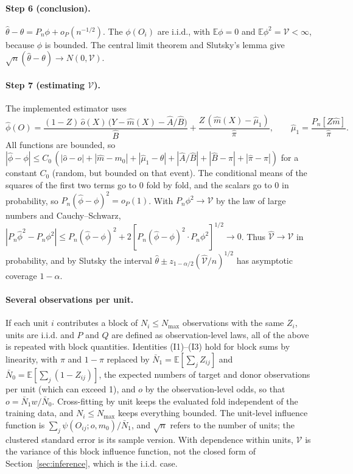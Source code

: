 \documentclass[11pt,a4paper]{article}
\newcommand{\E}{\mathbb{E}}
\theoremstyle{plain}
\theoremstyle{definition}
\begin{document}
\paragraph{Step 6 (conclusion).} $\hat\theta-\theta=P_n\phi+o_P(n^{-1/2})$. The $\phi(O_i)$ are i.i.d., with $\E\phi=0$ and $\E\phi^2=\mathcal V<\infty$, because $\phi$ is bounded. The central limit theorem and Slutsky's lemma give $\sqrt n(\hat\theta-\theta)\to N(0,\mathcal V)$.

\paragraph{Step 7 (estimating $\mathcal V$).} The implemented estimator uses
\[
\hat\phi(O)=\frac{(1-Z)\,\hat o(X)\,\bigl(Y-\hat m(X)-\hat A/\hat B\bigr)}{\hat B}+\frac{Z\,(\hat m(X)-\hat\mu_1)}{\hat\pi},\qquad\hat\mu_1=\frac{P_n[Z\hat m]}{\hat\pi}.
\]
All functions are bounded, so $|\hat\phi-\phi|\le C_0\,(|\hat o-o|+|\hat m-m_0|+|\hat\mu_1-\theta|+|\hat A/\hat B|+|\hat B-\pi|+|\hat\pi-\pi|)$ for a constant $C_0$ (random, but bounded on that event). The conditional means of the squares of the first two terms go to 0 fold by fold, and the scalars go to 0 in probability, so $P_n(\hat\phi-\phi)^2=o_P(1)$. With $P_n\phi^2\to \mathcal V$ by the law of large numbers and Cauchy--Schwarz, $|P_n\hat\phi^2-P_n\phi^2|\le P_n(\hat\phi-\phi)^2+2[P_n(\hat\phi-\phi)^2\cdot P_n\phi^2]^{1/2}\to0$. Thus $\hat{\mathcal V}\to \mathcal V$ in probability, and by Slutsky the interval $\hat\theta\pm z_{1-\alpha/2}(\hat{\mathcal V}/n)^{1/2}$ has asymptotic coverage $1-\alpha$.

\paragraph{Several observations per unit.} If each unit $i$ contributes a block of $N_i\le N_{\max}$ observations with the same $Z_i$, units are i.i.d. and $P$ and $Q$ are defined as observation-level laws, all of the above is repeated with block quantities. Identities (I1)--(I3) hold for block sums by linearity, with $\pi$ and $1-\pi$ replaced by $\bar N_1=\E[\sum_jZ_{ij}]$ and $\bar N_0=\E[\sum_j(1-Z_{ij})]$, the expected numbers of target and donor observations per unit (which can exceed 1), and $o$ by the observation-level odds, so that $o=\bar N_1w/\bar N_0$. Cross-fitting by unit keeps the evaluated fold independent of the training data, and $N_i\le N_{\max}$ keeps everything bounded. The unit-level influence function is $\sum_j\psi(O_{ij};o,m_0)/\bar N_1$, and $\sqrt n$ refers to the number of units; the clustered standard error is its sample version. With dependence within units, $\mathcal V$ is the variance of this block influence function, not the closed form of Section~\ref{sec:inference}, which is the i.i.d. case.
\end{document}
